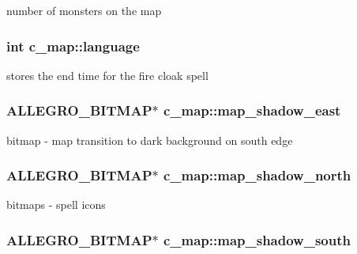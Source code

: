 number of monsters on the map \hypertarget{classc__map_af60c23046dcafb3b9c4a3e097f9e586e}{
\subsubsection[{language}]{\setlength{\rightskip}{0pt plus 5cm}int c\-\_\-map\-::language\hspace{0.3cm}{\ttfamily [protected]}}}\label{classc__map_af60c23046dcafb3b9c4a3e097f9e586e}
stores the end time for the fire cloak spell \hypertarget{classc__map_aa388806f4a767a2b6732b0ea3cf12e0d}{
\subsubsection[{map\-\_\-shadow\-\_\-east}]{\setlength{\rightskip}{0pt plus 5cm}A\-L\-L\-E\-G\-R\-O\-\_\-\-B\-I\-T\-M\-A\-P$\ast$ c\-\_\-map\-::map\-\_\-shadow\-\_\-east\hspace{0.3cm}{\ttfamily [protected]}}}\label{classc__map_aa388806f4a767a2b6732b0ea3cf12e0d}
bitmap -\/ map transition to dark background on south edge \hypertarget{classc__map_a5bf782d167ce72e2a115c4817954b3db}{
\subsubsection[{map\-\_\-shadow\-\_\-north}]{\setlength{\rightskip}{0pt plus 5cm}A\-L\-L\-E\-G\-R\-O\-\_\-\-B\-I\-T\-M\-A\-P$\ast$ c\-\_\-map\-::map\-\_\-shadow\-\_\-north\hspace{0.3cm}{\ttfamily [protected]}}}\label{classc__map_a5bf782d167ce72e2a115c4817954b3db}
bitmaps -\/ spell icons \hypertarget{classc__map_a0309d1046d20db4eb0bb065d0d4a6201}{
\subsubsection[{map\-\_\-shadow\-\_\-south}]{\setlength{\rightskip}{0pt plus 5cm}A\-L\-L\-E\-G\-R\-O\-\_\-\-B\-I\-T\-M\-A\-P$\ast$ c\-\_\-map\-::map\-\_\-shadow\-\_\-south\hspace{0.3cm}{\ttfamily [protected]}}}\label{classc__map_a0309d1046d20db4eb0bb065d0d4a6201}

